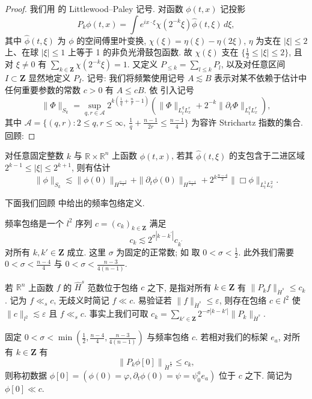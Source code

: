 \begin{proof}
我们用 \cite{klai70} 的 Littlewood--Paley 记号. 对函数 $\phi(t, x)$ 记投影
\[
P_k\phi(t, x) = \int e^{ix \cdot \xi} \chi(2^{-k}\xi)\hat\phi(t, \xi) \, d\xi,
\]
其中 $\hat\phi(t, \xi)$ 为 $\phi$ 的空间傅里叶变换, $\chi(\xi) = \eta(\xi) - \eta(2\xi)$, $\eta$ 为支在 $|\xi| \leq 2$ 上、在球 $|\xi| \leq 1$ 上等于 1 的非负光滑鼓包函数. 故 $\chi(\xi)$ 支在 $\{\frac{1}{2} \leq |\xi| \leq 2\}$, 且对 $\xi \neq 0$ 有 $\sum_{k \in \mathbf{Z}} \chi(2^{-k}\xi) = 1$. 又定义 $P_{\leq k} = \sum_{l \leq k} P_l$, 以及对任意区间 $I \subset \mathbf{Z}$ 显然地定义 $P_I$.
记号: 我们将频繁使用记号 $A \lesssim B$ 表示对某不依赖于估计中任何重要参数的常数 $c > 0$ 有 $A \leq cB$.
依 \cite{klai70} 引入记号
\[
\|\Phi\|_{S_{k}}=\sup_{q,r\in\mathcal{A}}2^{k\left(\frac{1}{q}+\frac{n}{r}-1\right)}\left(\|\Phi\|_{L_{t}^{q}L_{x}^{r}}+2^{-k}\|\partial_{t}\Phi\|_{L_{t}^{q}L_{x}^{r}}\right),
\]
其中 $\mathcal{A} = \{(q, r): 2 \leq q, r \leq \infty,\ \frac{1}{q} + \frac{n-1}{2r} \leq \frac{n-1}{4}\}$ 为容许 Strichartz 指数的集合. 回顾:\end{proof}

\begin{proposition}\label{prop:2.19}
对任意固定整数 $k$ 与 $\mathbb{R} \times \mathbb{R}^n$ 上函数 $\phi(t, x)$, 若其 $\hat{\phi}(t, \xi)$ 的支包含于二进区域 $2^{k-1} \leq |\xi| \leq 2^{k+1}$, 则有估计
\[
\|\phi\|_{S_{k}}\lesssim\|\phi(0)\|_{H^{\frac{n-2}{2}}}+\|\partial_{t}\phi(0)\|_{H^{\frac{n-4}{2}}}+2^{k\frac{n-4}{2}}\|\Box\phi\|_{L_{t}^{1}L_{x}^{2}}.
\]
\end{proposition}

下面我们回顾 \cite{klai70} 中给出的频率包络定义.
\begin{definition}\label{def:2.20}
频率包络是一个 $l^2$ 序列 $c = (c_k)_{k \in \mathbf{Z}}$ 满足
\[
c_{k}\lesssim2^{\sigma|k-k^{\prime}|}c_{k^{\prime}}
\]
对所有 $k, k' \in \mathbf{Z}$ 成立. 这里 $\sigma$ 为固定的正常数; 如 \cite{klai70} 取 $0 < \sigma < \frac{1}{2}$. 此外我们需要 $0 < \sigma < \frac{n-4}{4}$ 与 $0 < \sigma < \frac{n-3}{4(n-1)}$.\end{definition}

若 $\mathbb{R}^n$ 上函数 $f$ 的 $\hat{H}^s$ 范数位于包络 $c$ 之下, 是指对所有 $k \in \mathbf{Z}$ 有 $\|P_k f\|_{\dot{H}^s} \leq c_k$. 记为 $f \ll_s c$, 无歧义时简记 $f \ll c$. 易验证若 $\|f\|_{\dot{H}^s} \leq \varepsilon$, 则存在包络 $c \in l^2$ 使 $\|c\|_{l^2} \lesssim \varepsilon$ 且 $f \ll_s c$. 事实上我们可取 $c_k = \sum_{k' \in \mathbf{Z}} 2^{-\sigma |k - k'|} \|P_k\|_{\dot{H}^s}$.
\begin{definition}\label{def:2.21}
固定 $0 < \sigma < \min(\frac{1}{2}, \frac{n-4}{4}, \frac{n-3}{4(n-1)})$ 与频率包络 $c$. 若相对我们的标架 $e_a$, 对所有 $k \in \mathbf{Z}$ 有
\[
\left\|P_{k}\phi[0]\right\|_{\dot{H}^{\frac{n}{2}}}\leq c_{k},
\]
则称初数据 $\phi[0] = \left( \phi(0) = \varphi, \partial_t \phi(0) = \psi = \psi_0^a e_a \right)$ 位于 $c$ 之下. 简记为 $\phi[0] \ll c$.\end{definition}

